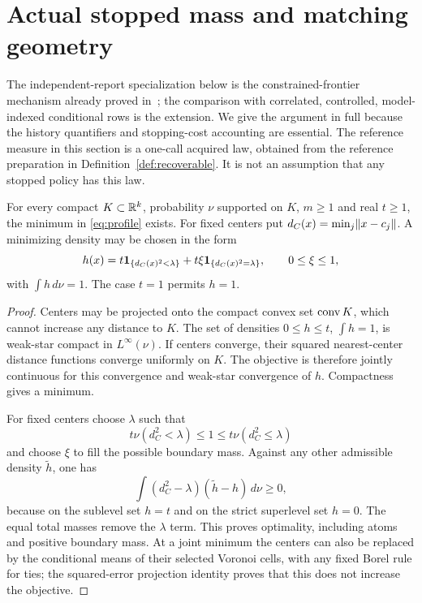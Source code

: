 \section{Actual stopped mass and matching geometry}\label{sec:profile-proof}
The independent-report specialization below is the constrained-frontier mechanism already proved in~\cite{GTFStopped}; the comparison with correlated, controlled, model-indexed conditional rows is the extension. We give the argument in full because the history quantifiers and stopping-cost accounting are essential.
The reference measure in this section is a one-call acquired law, obtained from the reference preparation in Definition~\ref{def:recoverable}. It is not an assumption that any stopped policy has this law.

\begin{lemma}\label{lem:profile}
For every compact $K\subset\mathbb R^k$, probability $\nu$ supported on $K$, $m\ge1$ and real $t\ge1$, the minimum in \eqref{eq:profile} exists. For fixed centers put $d_C(x)=\min_j\lVert x-c_j\rVert$. A minimizing density may be chosen in the form
\begin{equation}\label{eq:threshold-density}
 h(x)=t\mathbf 1_{\{d_C(x)^2<\lambda\}}
       +t\xi\mathbf 1_{\{d_C(x)^2=\lambda\}},\qquad 0\le\xi\le1,
\end{equation}
with $\int h\,d\nu=1$. The case $t=1$ permits $h=1$.
\end{lemma}
\begin{proof}
Centers may be projected onto the compact convex set $\operatorname{conv} K$, which cannot increase any distance to $K$. The set of densities $0\le h\le t$, $\int h=1$, is weak-star compact in $L^\infty(\nu)$. If centers converge, their squared nearest-center distance functions converge uniformly on $K$. The objective is therefore jointly continuous for this convergence and weak-star convergence of $h$. Compactness gives a minimum.

For fixed centers choose $\lambda$ such that
\[
 t\nu(d_C^2<\lambda)\le1\le t\nu(d_C^2\le\lambda)
\]
and choose $\xi$ to fill the possible boundary mass. Against any other admissible density $\widetilde h$, one has
\[
 \int(d_C^2-\lambda)(\widetilde h-h)\,d\nu\ge0,
\]
because on the sublevel set $h=t$ and on the strict superlevel set $h=0$. The equal total masses remove the $\lambda$ term. This proves optimality, including atoms and positive boundary mass. At a joint minimum the centers can also be replaced by the conditional means of their selected Voronoi cells, with any fixed Borel rule for ties; the squared-error projection identity proves that this does not increase the objective.
\end{proof}

